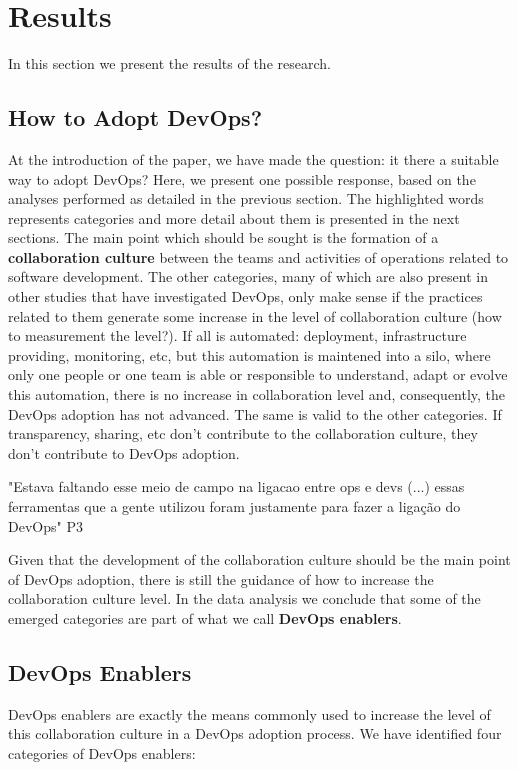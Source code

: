 \section{Results}
In this section we present the results of the research.

\subsection{How to Adopt DevOps?}
At the introduction of the paper, we have made the question: it there a
suitable way to adopt DevOps? Here, we present one possible response, based
on the analyses performed as detailed in the previous section. The highlighted
words represents categories and more detail about them is presented in the next
sections. The main point which should be sought is the formation of a
\textbf{collaboration culture} between the teams and activities of operations
related to software development. The other categories, many of which are also
present in other studies that have investigated DevOps, only make sense if
the practices related to them generate some increase in the level of
collaboration culture (how to measurement the level?). If all is automated:
deployment, infrastructure providing, monitoring, etc, but this automation is
maintened into a silo, where only one people or one team is able or responsible
to understand, adapt or evolve this automation, there is no increase in
collaboration level and, consequently, the DevOps adoption has not advanced.
The same is valid to the other categories. If transparency, sharing, etc don't
contribute to the collaboration culture, they don't contribute to DevOps
adoption.

"Estava faltando esse meio de campo na ligacao entre ops e devs (...) essas
ferramentas que a gente utilizou foram justamente para fazer a ligação do
DevOps" P3

Given that the development of the collaboration culture should be the main
point of DevOps adoption, there is still the guidance of how to increase the
collaboration culture level. In the data analysis we conclude that some of
the emerged categories are part of what we call \textbf{DevOps enablers}.

\subsection{DevOps Enablers}

DevOps enablers are exactly the means commonly used to increase the level of
this collaboration culture in a DevOps adoption process. We have identified
four categories of DevOps enablers:

